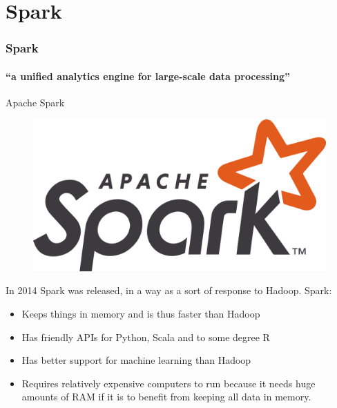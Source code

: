 \documentclass[aspectratio=169,usenames,dvipsnames]{beamer}
\begin{document}
\section{Spark}
    \begin{frame}
        \frametitle{Spark}
        \framesubtitle{``a unified analytics engine for large-scale data processing''}
        \begin{block}{Apache Spark}
        \begin{figure}
        \vspace{-1\baselineskip}
        \includegraphics[width=0.9\linewidth]{figures/Spark.png}\hfill
        \end{figure}
        In 2014 Spark was released, in a way as a sort of response to Hadoop. Spark:
        \begin{itemize}
            \item Keeps things in memory and is thus faster than Hadoop
        \end{itemize}\vspace{-4pt}

        \begin{itemize}
            \item Has friendly APIs for Python, Scala and to some degree R
            \item Has better support for machine learning than Hadoop
            \item Requires relatively expensive computers to run because it
            needs huge amounts of RAM if it is to benefit from keeping all data
            in memory.
        \end{itemize}
        \end{block}
    \end{frame}
\end{document}
